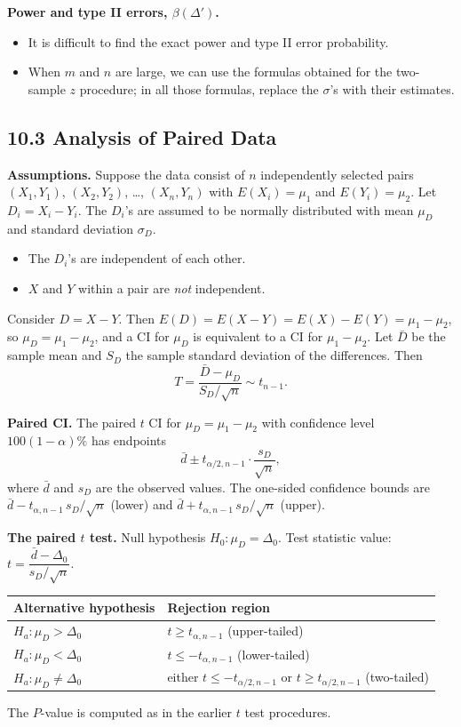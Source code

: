 \textbf{Power and type II errors, $\beta(\Delta')$.}
\begin{itemize}
  \item It is difficult to find the exact power and type II error probability.
  \item When $m$ and $n$ are large, we can use the formulas obtained for the two-sample $z$ procedure; in all those formulas, replace the $\sigma$'s with their estimates.
\end{itemize}

\subsection*{10.3 Analysis of Paired Data}

\textbf{Assumptions.} Suppose the data consist of $n$ independently selected pairs
$(X_1,Y_1)$, $(X_2,Y_2)$, \dots, $(X_n,Y_n)$ with $E(X_i)=\mu_1$ and $E(Y_i)=\mu_2$.
Let $D_i=X_i-Y_i$. The $D_i$'s are assumed to be normally distributed with mean $\mu_D$ and standard deviation $\sigma_D$.
\begin{itemize}
  \item The $D_i$'s are independent of each other.
  \item $X$ and $Y$ within a pair are \emph{not} independent.
\end{itemize}
Consider $D=X-Y$. Then $E(D)=E(X-Y)=E(X)-E(Y)=\mu_1-\mu_2$, so $\mu_D=\mu_1-\mu_2$, and a CI for $\mu_D$ is equivalent to a CI for $\mu_1-\mu_2$.
Let $\bar{D}$ be the sample mean and $S_D$ the sample standard deviation of the differences. Then
\[
T = \frac{\bar{D}-\mu_D}{S_D/\sqrt{n}} \sim t_{n-1}.
\]

\textbf{Paired CI.} The paired $t$ CI for $\mu_D=\mu_1-\mu_2$ with confidence level $100(1-\alpha)\%$ has endpoints
\[
\bar{d}\pm t_{\alpha/2,n-1}\cdot\frac{s_D}{\sqrt{n}},
\]
where $\bar{d}$ and $s_D$ are the observed values. The one-sided confidence bounds are
$\bar{d}-t_{\alpha,n-1}\,s_D/\sqrt{n}$ (lower) and $\bar{d}+t_{\alpha,n-1}\,s_D/\sqrt{n}$ (upper).

\textbf{The paired $t$ test.} Null hypothesis $H_0:\mu_D=\Delta_0$. Test statistic value: $t=\dfrac{\bar{d}-\Delta_0}{s_D/\sqrt{n}}$.

\begin{center}
\begin{tabular}{ll}
\toprule
Alternative hypothesis & Rejection region\\
\midrule
$H_a:\mu_D>\Delta_0$   & $t\ge t_{\alpha,n-1}$ (upper-tailed)\\
$H_a:\mu_D<\Delta_0$   & $t\le -t_{\alpha,n-1}$ (lower-tailed)\\
$H_a:\mu_D\ne\Delta_0$ & either $t\le -t_{\alpha/2,n-1}$ or $t\ge t_{\alpha/2,n-1}$ (two-tailed)\\
\bottomrule
\end{tabular}
\end{center}
The $P$-value is computed as in the earlier $t$ test procedures.


